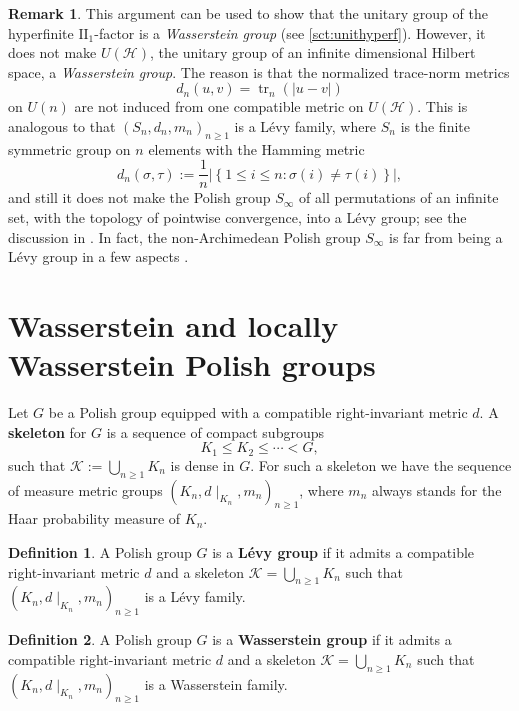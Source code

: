 \documentclass{amsart}
\providecommand{\definitionname}{Definition}
\numberwithin{equation}{subsection}
\theoremstyle{plain}
\theoremstyle{definition}
\newtheorem{defn}[defn]{\protect\definitionname}
\newtheorem{rem}[rem]{Remark}
\theoremstyle{plain}
\begin{document}
\begin{rem}
This argument can be used to show that the unitary group of the hyperfinite \(\mathrm{II}_{1}\)-factor is a \emph{Wasserstein group} (see \cref{sct:unithyperf}). However, it does not make \(U\left(\mathcal{H}\right)\), the unitary group of an infinite dimensional Hilbert space, a \emph{Wasserstein group}. The reason is that the normalized trace-norm metrics
\[d_{n}\left(u,v\right)=\operatorname{tr}_{n}\left(\left|u-v\right|\right)\]
on \(U\left(n\right)\) are not induced from one compatible metric on \(U\left(\mathcal{H}\right)\). This is analogous to that \(\left(S_{n},d_{n},m_{n}\right)_{n\geq 1}\) is a L\'{e}vy family, where \(S_{n}\) is the finite symmetric group on \(n\) elements with the Hamming metric
\[d_{n}\left(\sigma,\tau\right):=\frac{1}{n}\left|\left\{1\leq i\leq n:\sigma\left(i\right)\neq\tau\left(i\right)\right\}\right|,\]
and still it does not make the Polish group \(S_{\infty}\) of all permutations of an infinite set, with the topology of pointwise convergence, into a L\'{e}vy group; see the discussion in \cite[p.~91]{Pestov2006}. In fact, the non-Archimedean Polish group \(S_{\infty}\) is far from being a L\'{e}vy group in a few aspects \cite{kechris2014dynamics,glasner2005spatial}.
\end{rem}

\section{Wasserstein and locally Wasserstein Polish groups}\label{sct:Wass}

Let \(G\) be a Polish group equipped with a compatible right-invariant metric \(d\). A {\bf skeleton} for \(G\) is a sequence of compact subgroups
\[K_{1}\leq K_{2}\leq\dotsm<G,\]
such that \(\mathcal{K}:=\bigcup_{n\geq1}K_{n}\) is dense in \(G\). For such a skeleton we have the sequence of measure metric groups \(\left(K_{n},d\mid_{K_{n}},m_{n}\right)_{n\geq 1}\), where \(m_{n}\) always stands for the Haar probability measure of \(K_{n}\).

\begin{defn}
A Polish group \(G\) is a {\bf L\'{e}vy group} if it admits a compatible right-invariant metric \(d\) and a skeleton \(\mathcal{K}=\bigcup_{n\geq1}K_{n}\) such that \(\left(K_{n},d\mid_{K_{n}},m_{n}\right)_{n\geq1}\) is a L\'{e}vy family.
\end{defn}

\begin{defn}\label{def:WassersteinGroup}
A Polish group \(G\) is a {\bf Wasserstein group} if it admits a compatible right-invariant metric \(d\) and a skeleton \(\mathcal{K}=\bigcup_{n\geq1}K_{n}\) such that \(\left(K_{n},d\mid_{K_{n}},m_{n}\right)_{n\geq1}\) is a Wasserstein family.
\end{defn}
\end{document}
